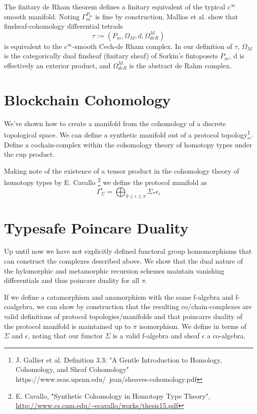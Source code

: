 \documentclass{article}
\begin{document}
The finitary de Rham theorem defines a finitary equivalent of the typical $c^{\infty}$ smooth manifold. Noting $\Gamma^{P_m}_m$ is fine by construction, Mallios et al. show that finsheaf-cohomology differential tetrads
\begin{equation} \label{eq1}
\tau := (P_m, \Omega_M, d, \Omega^M_{deR})
\end{equation} \label{eq1}
is equivalent to the $c^{\infty}$-smooth Cech-de Rham complex. In our definition of $\tau$, $\Omega_M$ is the categorically dual finsheaf (finitary sheaf) of Sorkin's  fintoposets $P_m$, d is effectively an exterior product, and $ \Omega^M_{deR}$ is the abstract de Rahm complex.

\section{Blockchain Cohomology}
We've shown how to create a manifold from the cohomology of a discrete topological space.  We can define a synthetic manifold out of a protocol topology\footnote{J. Gallier et al. Definition 3.3: "A Gentle Introduction to Homology, Cohomology, and
Sheaf Cohomology" https://www.seas.upenn.edu/~jean/sheaves-cohomology.pdf}. Define a cochain-complex within the cohomology theory of homotopy types under the cup product.

Making note of the existence of a tensor product in the cohomology theory of homotopy types by E. Cavallo \footnote{E. Cavallo, "Synthetic Cohomology in Homotopy Type Theory", \url{http://www.cs.cmu.edu/~ecavallo/works/thesis15.pdf}} we define the protocol manifold as 
\begin{equation} \label{eq1}
\Gamma^\epsilon_{\Sigma} = \bigoplus_{0 \leq i \leq \pi} \Sigma_* \epsilon_i
\end{equation} \label{eq1}

\section{Typesafe Poincare Duality}
Up until now we have not explicitly defined functoral group homomorphisms that can construct the complexes described above. We show that the dual nature of the hylomorphic and metamorphic recursion schemes maintain vanishing differentials and thus poincare duality for all $\pi$.

If we define a catamorphism and anamorphism with the same f-algebra and f-coalgebra, we can show by construction that the resulting co/chain-complexes are valid definitions of protocol topologies/manifolds and that poincarre duality of the protocol manifold is maintained up to $\pi$ isomorphism. We define in terms of $\Sigma$ and $\epsilon$, noting that our functor $\Sigma$ is a valid f-algebra and sheaf $\epsilon$ a co-algebra.
\end{document}
